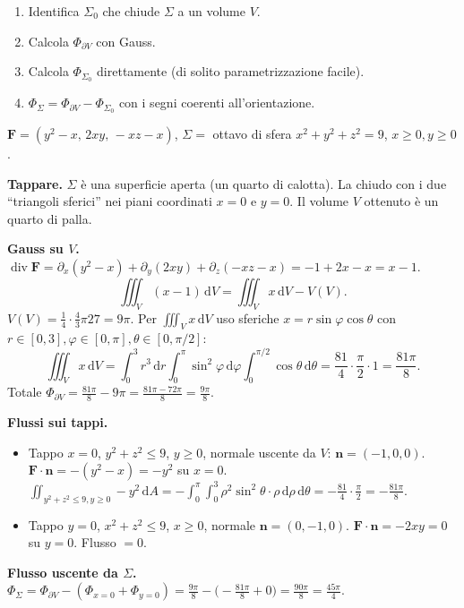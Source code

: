 \documentclass[11pt,a4paper,openany]{book}
\theoremstyle{plain}
\theoremstyle{definition}
\theoremstyle{remark}
\newcommand{\dd}{\,\mathrm{d}}
\newcommand{\Div}{\operatorname{div}}
\renewcommand{\vec}[1]{\mathbf{#1}}
\newcommand{\F}{\mathbf{F}}
\begin{document}
\begin{ricetta}[title={Tappare e Gauss}]
\begin{enumerate}
\item Identifica $\Sigma_0$ che chiude $\Sigma$ a un volume $V$.
\item Calcola $\Phi_{\partial V}$ con Gauss.
\item Calcola $\Phi_{\Sigma_0}$ direttamente (di solito
   parametrizzazione facile).
\item $\Phi_\Sigma=\Phi_{\partial V}-\Phi_{\Sigma_0}$ con i segni
   coerenti all'orientazione.
\end{enumerate}
\end{ricetta}


\begin{esempio}[title={23/1/2023 --- Esercizio 3, schema generale}]
$\F=(y^2-x,\,2xy,\,-xz-x)$, $\Sigma=$ ottavo di sfera $x^2+y^2+z^2=9$,
$x\ge 0,y\ge 0$.

\textbf{Tappare.} $\Sigma$ \`e una superficie aperta (un quarto di
calotta). La chiudo con i due ``triangoli sferici'' nei piani
coordinati $x=0$ e $y=0$. Il volume $V$ ottenuto \`e un quarto di palla.

\textbf{Gauss su $V$.}
$\Div\F=\partial_x(y^2-x)+\partial_y(2xy)+\partial_z(-xz-x)=-1+2x-x=x-1$.
\[
\iiint_V(x-1)\dd V=\iiint_V x\dd V-V(V).
\]
$V(V)=\frac14\cdot\frac43\pi 27=9\pi$. Per $\iiint_V x\dd V$ uso
sferiche $x=r\sin\varphi\cos\theta$ con
$r\in[0,3],\varphi\in[0,\pi],\theta\in[0,\pi/2]$:
\[
\iiint_V x\dd V=\int_0^3 r^3\dd r\int_0^\pi\sin^2\varphi\dd\varphi
\int_0^{\pi/2}\cos\theta\dd\theta
=\frac{81}{4}\cdot\frac{\pi}{2}\cdot 1=\frac{81\pi}{8}.
\]
Totale $\Phi_{\partial V}=\frac{81\pi}{8}-9\pi=\frac{81\pi-72\pi}{8}=\frac{9\pi}{8}$.

\textbf{Flussi sui tappi.}
\begin{itemize}
\item Tappo $x=0$, $y^2+z^2\le 9$, $y\ge 0$, normale uscente da $V$: $\vec n=(-1,0,0)$.
   $\F\cdot\vec n=-(y^2-x)=-y^2$ su $x=0$.
   $\iint_{y^2+z^2\le 9,y\ge 0}-y^2\dd A=
   -\int_0^\pi\int_0^3\rho^2\sin^2\theta\cdot\rho\dd\rho\dd\theta
   =-\frac{81}{4}\cdot\frac{\pi}{2}=-\frac{81\pi}{8}$.
\item Tappo $y=0$, $x^2+z^2\le 9$, $x\ge 0$, normale $\vec n=(0,-1,0)$.
   $\F\cdot\vec n=-2xy=0$ su $y=0$. Flusso $=0$.
\end{itemize}

\textbf{Flusso uscente da $\Sigma$.}
$\Phi_\Sigma=\Phi_{\partial V}-(\Phi_{x=0}+\Phi_{y=0})=
\frac{9\pi}{8}-\big(-\frac{81\pi}{8}+0\big)=\frac{90\pi}{8}=\frac{45\pi}{4}$.


\end{esempio}
\end{document}
